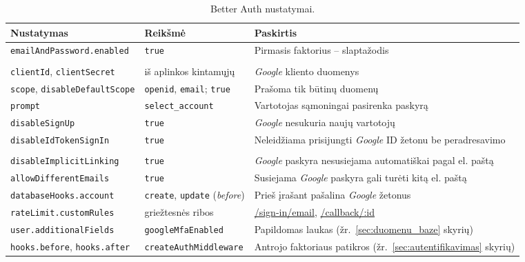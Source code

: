 \begin{table}[H]
    \centering
    \caption{Better Auth nustatymai.}
    \label{tab:konfiguracija}
    \small
    \begin{tabularx}{\textwidth}{>{\raggedright\arraybackslash}p{5.2cm} >{\raggedright\arraybackslash}p{3.4cm} L}
        \toprule
        \textbf{Nustatymas} & \textbf{Reikšmė} & \textbf{Paskirtis} \\
        \midrule
        \texttt{emailAndPassword.enabled} & \texttt{true} & Pirmasis faktorius -- slaptažodis \\
        \midrule
         \\
        \quad\texttt{clientId}, \texttt{clientSecret} & iš aplinkos kintamųjų & \textit{Google} kliento duomenys \\
        \quad\texttt{scope}, \texttt{disableDefaultScope} & \texttt{openid}, \texttt{email}; \texttt{true} & Prašoma tik būtinų duomenų \\
        \quad\texttt{prompt} & \texttt{select\_account} & Vartotojas sąmoningai pasirenka paskyrą \\
        \quad\texttt{disableSignUp} & \texttt{true} & \textit{Google} nesukuria naujų vartotojų \\
        \quad\texttt{disableIdTokenSignIn} & \texttt{true} & Neleidžiama prisijungti \textit{Google} ID žetonu be peradresavimo \\
        \midrule
         \\
        \quad\texttt{disableImplicitLinking} & \texttt{true} & \textit{Google} paskyra nesusiejama automatiškai pagal el. paštą \\
        \quad\texttt{allowDifferentEmails} & \texttt{true} & Susiejama \textit{Google} paskyra gali turėti kitą el. paštą \\
        \midrule
        \texttt{databaseHooks.account} & \texttt{create}, \texttt{update} (\textit{before}) & Prieš įrašant pašalina \textit{Google} žetonus \\
        \texttt{rateLimit.customRules} & griežtesnės ribos & \url{/sign-in/email}, \url{/callback/:id} \\
        \texttt{user.additionalFields} & \texttt{googleMfaEnabled} & Papildomas laukas (žr.~\ref{sec:duomenu_baze} skyrių) \\
        \texttt{hooks.before}, \texttt{hooks.after} & \texttt{createAuthMiddleware} & Antrojo faktoriaus patikros (žr.~\ref{sec:autentifikavimas} skyrių) \\
        \bottomrule
    \end{tabularx}
\end{table}

